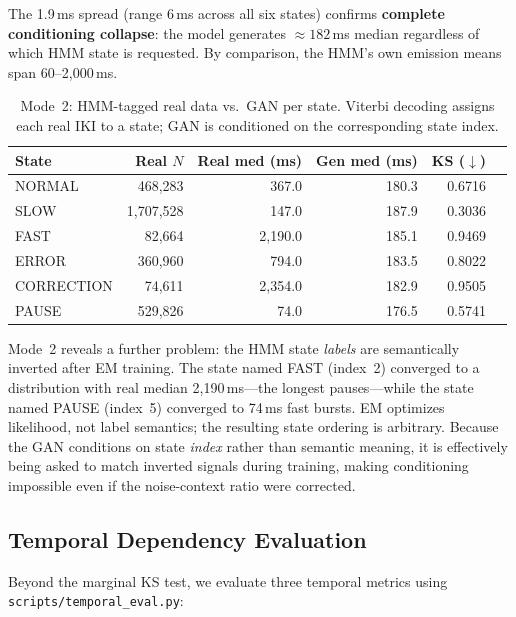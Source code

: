 \documentclass[sigconf,nonacm]{acmart}
\begin{document}
The 1.9\,ms spread (range 6\,ms across all six states) confirms
\textbf{complete conditioning collapse}: the model generates
$\approx\!182$\,ms median regardless of which HMM state is requested.
By comparison, the HMM's own emission means span 60--2{,}000\,ms.

\begin{table}[t]
\centering
\caption{Mode~2: HMM-tagged real data vs.\ GAN per state.
  Viterbi decoding assigns each real IKI to a state; GAN is conditioned
  on the corresponding state index.}
\begin{tabular}{lrrrrr}
\toprule
State & Real $N$ & Real med (ms) & Gen med (ms) & KS ($\downarrow$) \\
\midrule
NORMAL     & 468,283   & 367.0   & 180.3 & 0.6716 \\
SLOW       & 1,707,528 & 147.0   & 187.9 & 0.3036 \\
FAST       & 82,664    & 2{,}190.0 & 185.1 & 0.9469 \\
ERROR      & 360,960   & 794.0   & 183.5 & 0.8022 \\
CORRECTION & 74,611    & 2{,}354.0 & 182.9 & 0.9505 \\
PAUSE      & 529,826   & 74.0    & 176.5 & 0.5741 \\
\bottomrule
\end{tabular}
\label{tab:perstate_tagged}
\end{table}

Mode~2 reveals a further problem: the HMM state \emph{labels} are
semantically inverted after EM training.
The state named FAST (index~2) converged to a distribution with real
median 2{,}190\,ms---the longest pauses---while the state named PAUSE
(index~5) converged to 74\,ms fast bursts.
EM optimizes likelihood, not label semantics; the resulting state ordering
is arbitrary.
Because the GAN conditions on state \emph{index} rather than semantic
meaning, it is effectively being asked to match inverted signals during
training, making conditioning impossible even if the noise-context ratio
were corrected.

\subsection{Temporal Dependency Evaluation}

Beyond the marginal KS test, we evaluate three temporal metrics using
\texttt{scripts/temporal\_eval.py}:
\end{document}
